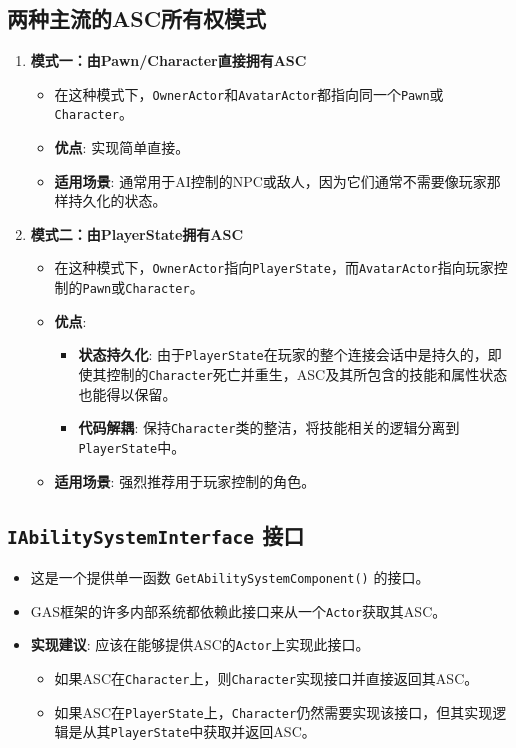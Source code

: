 \documentclass[10pt,CJKmath]{zhbook-v1}
\begin{document}
\subsection{两种主流的ASC所有权模式}
\begin{enumerate}
    \item \textbf{模式一：由Pawn/Character直接拥有ASC}
    \begin{itemize}
        \item 在这种模式下，\texttt{OwnerActor}和\texttt{AvatarActor}都指向同一个\texttt{Pawn}或\texttt{Character}。
        \item \textbf{优点}: 实现简单直接。
        \item \textbf{适用场景}: 通常用于AI控制的NPC或敌人，因为它们通常不需要像玩家那样持久化的状态。
    \end{itemize}
    
    \item \textbf{模式二：由PlayerState拥有ASC}
    \begin{itemize}
        \item 在这种模式下，\texttt{OwnerActor}指向\texttt{PlayerState}，而\texttt{AvatarActor}指向玩家控制的\texttt{Pawn}或\texttt{Character}。
        \item \textbf{优点}:
        \begin{itemize}
            \item \textbf{状态持久化}: 由于\texttt{PlayerState}在玩家的整个连接会话中是持久的，即使其控制的\texttt{Character}死亡并重生，ASC及其所包含的技能和属性状态也能得以保留。
            \item \textbf{代码解耦}: 保持\texttt{Character}类的整洁，将技能相关的逻辑分离到\texttt{PlayerState}中。
        \end{itemize}
        \item \textbf{适用场景}: 强烈推荐用于玩家控制的角色。
    \end{itemize}
\end{enumerate}

\subsection{\texttt{IAbilitySystemInterface} 接口}
\begin{itemize}
    \item 这是一个提供单一函数 \texttt{GetAbilitySystemComponent()} 的接口。
    \item GAS框架的许多内部系统都依赖此接口来从一个\texttt{Actor}获取其ASC。
    \item \textbf{实现建议}: 应该在能够提供ASC的\texttt{Actor}上实现此接口。
    \begin{itemize}
        \item 如果ASC在\texttt{Character}上，则\texttt{Character}实现接口并直接返回其ASC。
        \item 如果ASC在\texttt{PlayerState}上，\texttt{Character}仍然需要实现该接口，但其实现逻辑是从其\texttt{PlayerState}中获取并返回ASC。
    \end{itemize}
\end{itemize}
\end{document}
